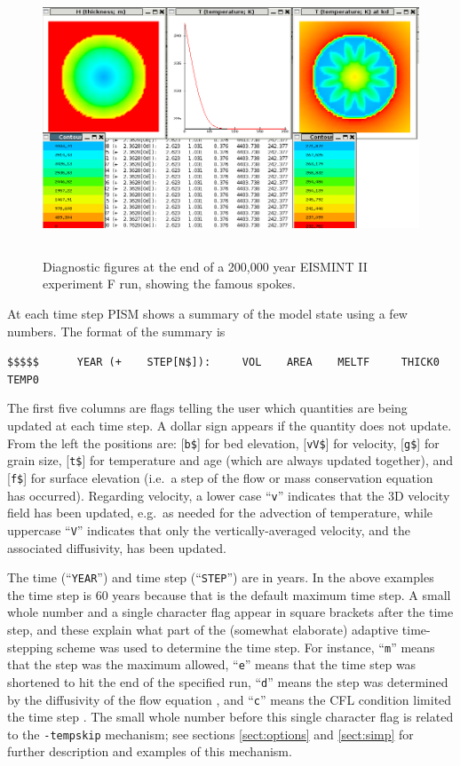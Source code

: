 \documentclass[11pt,final]{amsart}
\renewcommand{\t}[1]{\texttt{#1}}
\begin{document}
\begin{figure}[ht]
\includegraphics[height=3.2in,keepaspectratio=true]{figs/eisIIFshot}
\caption{Diagnostic figures at the end of a 200,000 year EISMINT II experiment F run, showing the famous spokes.}
\label{fig:screenshot}
\end{figure}

At each time step PISM shows a summary of the model state using a few numbers.  The format of the summary is

\small\verb|$$$$$      YEAR (+    STEP[N$]):     VOL    AREA    MELTF     THICK0     TEMP0|\normalsize

\noindent The first five columns are flags telling the user which quantities are being updated at each time step.  A dollar sign appears if the quantity does not update.  From the left the positions are: [\t{b\$}] for bed elevation, [\t{vV\$}] for velocity, [\t{g\$}] for grain size, [\t{t\$}] for temperature and age (which are always updated together), and [\t{f\$}] for surface elevation (i.e.~a step of the flow or mass conservation equation has occurred).  Regarding velocity, a lower case ``\texttt{v}'' indicates that the 3D velocity field has been updated, e.g.~as needed for the advection of temperature, while uppercase ``\texttt{V}'' indicates that only the vertically-averaged velocity, and the associated diffusivity, has been updated.

The time (``\t{YEAR}'') and time step (``\t{STEP}'') are in years.  In the above examples the time step is 60 years because that is the default maximum time step.  A small whole number and a single character flag appear in square brackets after the time step, and these explain what part of the (somewhat elaborate) adaptive time-stepping scheme was used to determine the time step.  For instance, ``\t{m}'' means that the step was the maximum allowed, ``\t{e}'' means that the time step was shortened to hit the end of the specified run, ``\t{d}'' means the step was determined by the diffusivity of the flow equation \cite{BBL}, and ``\t{c}'' means the CFL condition limited the time step \cite{BBL,MortonMayers}.  The small whole number before this single character flag is related to the \verb|-tempskip| mechanism; see sections \ref{sect:options} and \ref{sect:simp} for further description and examples of this mechanism.
\end{document}
